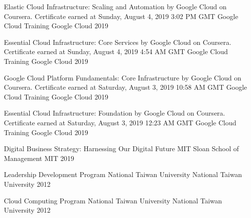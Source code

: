 

\begin{cvhonors}

  \cvhonor
    {Elastic Cloud Infrastructure: Scaling and Automation by Google Cloud on Coursera. Certificate earned at Sunday, August 4, 2019 3:02 PM GMT} %
    {Google Cloud Training} %
    {Google Cloud} %
    {2019} %

  \cvhonor
    {Essential Cloud Infrastructure: Core Services by Google Cloud on Coursera. Certificate earned at Sunday, August 4, 2019 4:54 AM GMT} %
    {Google Cloud Training} %
    {Google Cloud} %
    {2019} %

  \cvhonor
    {Google Cloud Platform Fundamentals: Core Infrastructure by Google Cloud on Coursera. Certificate earned at Saturday, August 3, 2019 10:58 AM GMT} %
    {Google Cloud Training} %
    {Google Cloud} %
    {2019} %

  \cvhonor
    {Essential Cloud Infrastructure: Foundation by Google Cloud on Coursera. Certificate earned at Saturday, August 3, 2019 12:23 AM GMT} %
    {Google Cloud Training} %
    {Google Cloud} %
    {2019} %

  \cvhonor
    {Digital Business Strategy: Harnessing Our Digital Future} %
    {MIT Sloan School of Management} %
    {MIT} %
    {2019} %

  \cvhonor
    {Leadership Development Program} %
    {National Taiwan University} %
    {National Taiwan University} %
    {2012} %

  \cvhonor
    {Cloud Computing Program} %
    {National Taiwan University} %
    {National Taiwan University} %
    {2012} %

\end{cvhonors}
